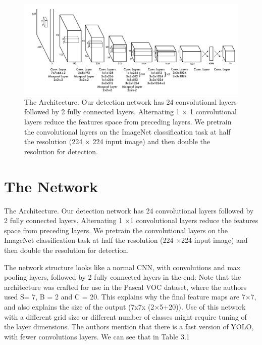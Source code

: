 \begin{figure}[h]
    \centering
    \includegraphics[max width=\textwidth]{images/ours/layers.png}
   \caption[The YOLOv5 Architecture]{ The Architecture. Our detection network has 24 convolutional layers followed
by 2 fully connected layers. Alternating 1 × 1 convolutional layers reduce the
features space from preceding layers. We pretrain the convolutional layers on the
ImageNet classification task at half the resolution (224 × 224 input image) and
then double the resolution for detection.
 }
    \label{fig:yolo-layers}
\end{figure}

\section{The Network}
The Architecture. Our detection network has 24 convolutional layers followed
by 2 fully connected layers. Alternating 1 ×1 convolutional layers reduce the
features space from preceding layers. We pretrain the convolutional layers on
the ImageNet classification task at half the resolution (224 ×224 input image)
and then double the resolution for detection.


The network structure looks like a normal CNN, with convolutions and max pooling layers, followed by 2 fully connected layers in the end: Note that the architecture was crafted for use in the Pascal VOC dataset, where the authors used S= 7, B = 2 and C = 20. This explains why the final feature maps are 7×7, and also explains the size of the output (7x7x (2×5+20)). Use of this network with a different grid size or different number of classes might require tuning of the layer dimensions. The authors mention that there is a fast version of YOLO, with fewer convolutions layers. We can see that in Table 3.1


